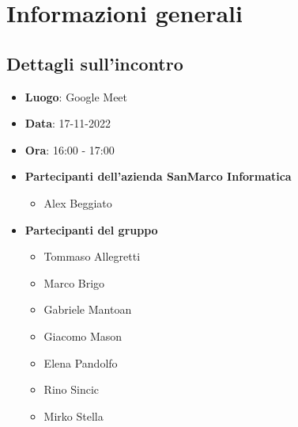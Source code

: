 \section{Informazioni generali}

\subsection{Dettagli sull'incontro}
\begin{itemize}
    \item \textbf{Luogo}: Google Meet
    \item \textbf{Data}: 17-11-2022
    \item \textbf{Ora}: 16:00 - 17:00
    \item \textbf{Partecipanti dell'azienda SanMarco Informatica}
        \begin{itemize}
            \item Alex Beggiato
        \end{itemize}
    \item \textbf{Partecipanti del gruppo}
        \begin{itemize}
            \item Tommaso Allegretti
            \item Marco Brigo
            \item Gabriele Mantoan
            \item Giacomo Mason
            \item Elena Pandolfo
            \item Rino Sincic
            \item Mirko Stella
        \end{itemize}
\end{itemize}

